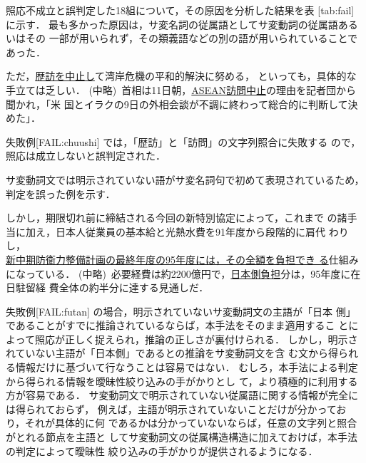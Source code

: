 照応不成立と誤判定した18組について，その原因を分析した結果を表
[tab:fail] に示す．
最も多かった原因は，サ変名詞の従属語としてサ変動詞の従属語あるいはその
一部が用いられず，その類義語などの別の語が用いられていることであった．
\begin{FAIL}
\fail  ただ，\underline{歴訪を中止し}て湾岸危機の平和的解決に努める，
といっても，具体的な手立ては乏しい．
(中略)\ 
首相は11日朝，\underline{ASEAN訪問中止}の理由を記者団から聞かれ，「米
国とイラクの9日の外相会談が不調に終わって総合的に判断して決めた」．
\label{FAIL:chuushi}
\end{FAIL}
失敗例[FAIL:chuushi] では，「歴訪」と「訪問」の文字列照合に失敗する
ので，照応は成立しないと誤判定された．

サ変動詞文では明示されていない語がサ変名詞句で初めて表現されているため，
判定を誤った例を示す．
\begin{FAIL}
\fail しかし，期限切れ前に締結される今回の新特別協定によって，これまで
の諸手当に加え，日本人従業員の基本給と光熱水費を91年度から段階的に肩代
わりし，\\
\underline{新中期防衛力整備計画の最終年度の95年度には，その全額を負担でき
る}仕組みになっている．
(中略)\ 
必要経費は約2200億円で，\underline{日本側負担}分は，95年度に在\\日駐留経
費全体の約半分に達する見通しだ．\label{FAIL:futan}
\end{FAIL}
失敗例[FAIL:futan] の場合，明示されていないサ変動詞文の主語が「日本
側」であることがすでに推論されているならば，本手法をそのまま適用するこ
とによって照応が正しく捉えられ，推論の正しさが裏付けられる．
しかし，明示されていない主語が「日本側」であるとの推論をサ変動詞文を含
む文から得られる情報だけに基づいて行なうことは容易ではない．
むしろ，本手法による判定から得られる情報を曖昧性絞り込みの手がかりとし
て，より積極的に利用する方が容易である．
サ変動詞文で明示されていない従属語に関する情報が完全には得られておらず，
例えば，主語が明示されていないことだけが分かっており，それが具体的に何
であるかは分かっていないならば，任意の文字列と照合がとれる節点を主語と
してサ変動詞文の従属構造構造に加えておけば，本手法の判定によって曖昧性
絞り込みの手がかりが提供されるようになる．

